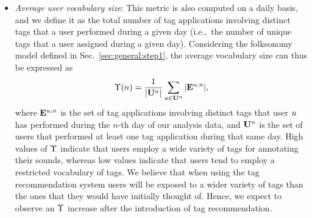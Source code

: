 \begin{itemize}
	\item \textit{Average user vocabulary size}: This metric is also computed on a daily basis, and we define it as the total number of tag applications involving distinct tags that a user performed during a given day (i.e.,~the number of unique tags that a user assigned during a given day). Considering the folksonomy model defined in Sec.~\ref{sec:general:step1}, the average vocabulary size can thus be expressed as
\begin{equation} \Upsilon({n}) =  \frac{1}{|\mathbf{U}^{n}|}\sum\limits_{u\in \mathbf{U}^{n}}{|\mathbf{E}^{u,n}|}, \label{impact:eq:user_vocabulary_size} \end{equation}
where $\mathbf{E}^{u,n}$ is the set of tag applications involving distinct tags that user $u$ has performed during the $n$-th day of our analysis data, and $\mathbf{U}^{n}$ is the set of users that performed at least one tag application during that same day. High values of $\Upsilon$ indicate that users employ a wide variety of tags for annotating their sounds, whereas low values indicate that users tend to employ a restricted vocabulary of tags. We believe that when using the tag recommendation system users will be exposed to a wider variety of tags than the ones that they would have initially thought of. Hence, we expect to observe an $\Upsilon$ increase after the introduction of tag recommendation.


\end{itemize}
